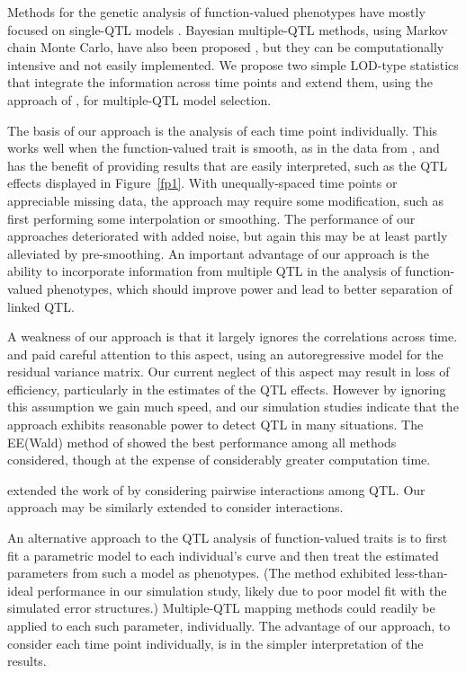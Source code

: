 \documentclass[12pt,letterpaper]{article}
\begin{document}
Methods for the genetic analysis of function-valued phenotypes have
mostly focused on single-QTL models \citep{Ma2002, Yang2009, Yap2009,
Xiong2011}. Bayesian multiple-QTL methods, using Markov chain Monte
Carlo, have also been proposed \citep{Min2011, Sillanpaa2012}, but
they can be computationally intensive and not easily implemented. We
propose two simple LOD-type statistics that integrate the information
across time points and extend them, using the approach of
\citet{Broman2002}, for multiple-QTL model selection.

The basis of our approach is the analysis of each time point
individually. This works well when the function-valued trait is
smooth, as in the data from \citet{Moore2013}, and has the benefit of
providing results that are easily interpreted, such as the QTL effects
displayed in Figure~\ref{fp1}. With unequally-spaced time points or
appreciable missing data, the approach may require some modification,
such as first performing some interpolation or smoothing.
The
performance of our approaches deteriorated with added noise, but again
this may be at least partly alleviated by pre-smoothing.
An important advantage
of our approach is the ability to incorporate information from
multiple QTL in the analysis of function-valued phenotypes, which
should improve power and lead to better separation of linked QTL.

A weakness of our approach is that it largely ignores the correlations
across time. \citet{Ma2002} and \citet{Yang2009} paid careful attention
to this aspect, using an autoregressive model for the residual
variance matrix. Our current neglect of this aspect may result in
loss of efficiency, particularly in the estimates of the QTL
effects. However by ignoring this assumption we gain much speed, and
our simulation studies indicate that the approach exhibits reasonable
power to detect QTL in many situations. The EE(Wald)
method of \citet{Xiong2011} showed the best performance among all
methods considered, though at the expense of considerably greater
computation time.


\citet{Manichaikul2009} extended the work of \citet{Broman2002} by
considering pairwise interactions among QTL. Our approach may be
similarly extended to consider interactions.

An alternative approach to the QTL analysis of function-valued traits
is to first fit a parametric model to each individual's curve and then
treat the estimated parameters from such a model as
phenotypes. (The method exhibited less-than-ideal performance in our
simulation study, likely due to poor model fit with the simulated error
structures.)
Multiple-QTL mapping methods could readily be applied to
each such parameter, individually. The advantage of our approach, to
consider each time point individually, is in the simpler interpretation
of the results.
\end{document}
